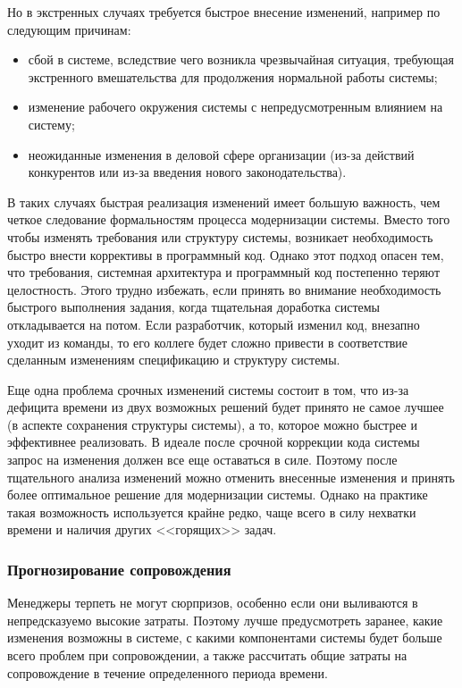 \documentclass{../../text-style}
\begin{document}
Но в экстренных случаях требуется быстрое внесение изменений, например по следующим причинам:

\begin{itemize}
    \item сбой в системе, вследствие чего возникла чрезвычайная ситуация, требующая экстренного вмешательства для продолжения нормальной работы системы;
    \item изменение рабочего окружения системы с непредусмотренным влиянием на систему;
    \item неожиданные изменения в деловой сфере организации (из-за действий конкурентов или из-за введения нового законодательства).
\end{itemize}

В таких случаях быстрая реализация изменений имеет большую важность, чем четкое следование формальностям процесса модернизации системы. Вместо того чтобы изменять требования или структуру системы, возникает необходимость быстро внести коррективы в программный код. Однако этот подход опасен тем, что требования, системная архитектура и программный код постепенно теряют целостность. Этого трудно избежать, если принять во внимание необходимость быстрого выполнения задания, когда тщательная доработка системы откладывается на потом. Если разработчик, который изменил код, внезапно уходит из команды, то его коллеге будет сложно привести в соответствие сделанным изменениям спецификацию и структуру системы.

Еще одна проблема срочных изменений системы состоит в том, что из-за дефицита времени из двух возможных решений будет принято не самое лучшее (в аспекте сохранения структуры системы), а то, которое можно быстрее и эффективнее реализовать. В идеале после срочной коррекции кода системы запрос на изменения должен все еще оставаться в силе. Поэтому после тщательного анализа изменений можно отменить внесенные изменения и принять более оптимальное решение для модернизации системы. Однако на практике такая возможность используется крайне редко, чаще всего в силу нехватки времени и наличия других <<горящих>> задач.

\subsubsection{Прогнозирование сопровождения}

Менеджеры терпеть не могут сюрпризов, особенно если они выливаются в непредсказуемо высокие затраты. Поэтому лучше предусмотреть заранее, какие изменения возможны в системе, с какими компонентами системы будет больше всего проблем при сопровождении, а также рассчитать общие затраты на сопровождение в течение определенного периода времени. 
\end{document}
